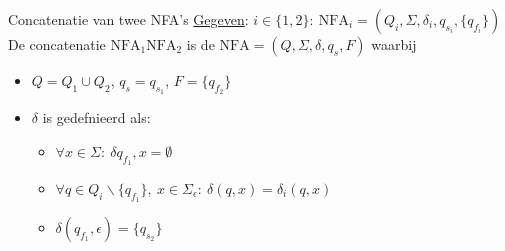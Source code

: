 \begin{pro}{Concatenatie van twee NFA's}
    \underline{Gegeven}: $i \in \{1,2\}: \ \text{NFA}_i = (Q_i,\Sigma, \delta_i, q_{s_i}, \{q_{f_i}\})$ \\

    De concatenatie $\text{NFA}_1\text{NFA}_2$ is de $\text{NFA} = (Q,\Sigma, \delta, q_s, F)$ waarbij \\

    \vspace{-0.2cm}
    \begin{minipage}{.6\textwidth}
        \begin{itemize}
            \item $Q = Q_1 \cup Q_2$, $q_s = q_{s_1}$, $F = \{q_{f_2}\}$
            \item 
                $\delta$ is gedefnieerd als:
                \begin{itemize}
                    \item $\forall x \in \Sigma: \ \delta{q_{f_1}, x} = \emptyset$
                    \item $\forall q \in Q_{i}\backslash \{q_{f_1}\}, \ x \in \Sigma_{\epsilon}: \ \delta(q,x) = \delta_i(q,x)$
                    \item $\delta(q_{f_1}, \epsilon) = \{q_{s_2}\}$
                \end{itemize}
        \end{itemize}

\end{minipage}
\end{pro}
